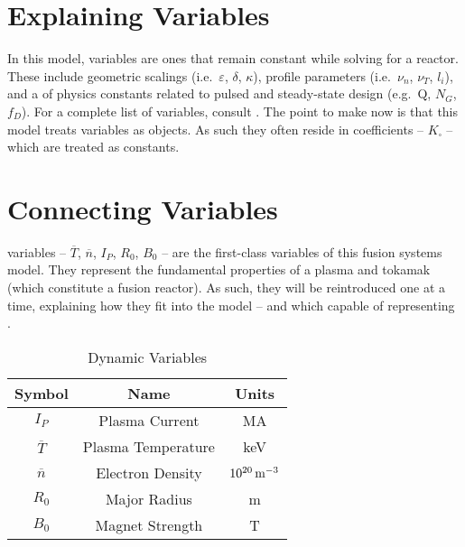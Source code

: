 \section{Explaining  Variables}

In this model,  variables are ones that remain constant while solving for a reactor. These include geometric scalings (i.e.\ $\varepsilon$, $\delta$, $\kappa$), profile parameters (i.e.\ $\nu_n$, $\nu_T$, $l_i$), and a  of physics constants related to pulsed and steady-state design (e.g.\ Q, $N_G$, $f_D$). For a complete list of  variables, consult . The point to make now is that this model treats  variables as  objects. As such they often reside in  coefficients -- $K_\square$ -- which are treated as constants.

\section{Connecting  Variables}

 variables -- $\overline T$, $\overline n$, $I_P$, $R_0$, $B_0$ -- are the first-class variables of this fusion systems model. They represent the fundamental properties of a plasma and tokamak (which constitute a fusion reactor). As such, they will be reintroduced one at a time, explaining how they fit into the model -- and which  capable of representing .

\begin{table}[h!]
\centering
\caption{Dynamic Variables}
\begin{tabular}{ c|c|c }

\textbf{Symbol} & \textbf{Name} & \textbf{Units} \\
\hline
$I_P$ & Plasma Current & MA \\
$\overline{T}$ & Plasma Temperature & keV \\
$\overline{n}$ & Electron Density & $10^{20} \, \textnormal{m}^{-3}$ \\
$R_0$ &  Major Radius & m \\
$B_0$ &  Magnet Strength & T
\end{tabular}
\label{table:dynamic}
\end{table}

